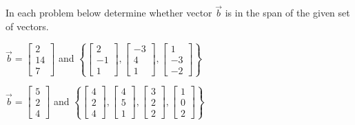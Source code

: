 \documentclass{ximera}
\begin{document}
 \begin{problem}
 In each problem below determine whether vector $\vec{b}$ is in the span of the given set of vectors.
 \begin{problem}\label{prob:spanofvect1}
 $\vec{b}=\begin{bmatrix}2\\14\\7\end{bmatrix}$ and $\left\{\begin{bmatrix}2\\-1\\1\end{bmatrix}, \begin{bmatrix}-3\\4\\1\end{bmatrix}, \begin{bmatrix}1\\-3\\-2\end{bmatrix}\right\}$
 \begin{multipleChoice}
 \end{multipleChoice}
 \end{problem}
 
 \begin{problem}\label{prob:spanofvect2}
 $\vec{b}=\begin{bmatrix}5\\2\\4\end{bmatrix}$ and $\left\{\begin{bmatrix}4\\2\\4\end{bmatrix}, \begin{bmatrix}4\\5\\1\end{bmatrix}, \begin{bmatrix}3\\2\\2\end{bmatrix}, \begin{bmatrix}1\\0\\2\end{bmatrix}\right\}$
 \begin{multipleChoice}
 \end{multipleChoice}
 \end{problem}
 

\end{problem}
\end{document}
